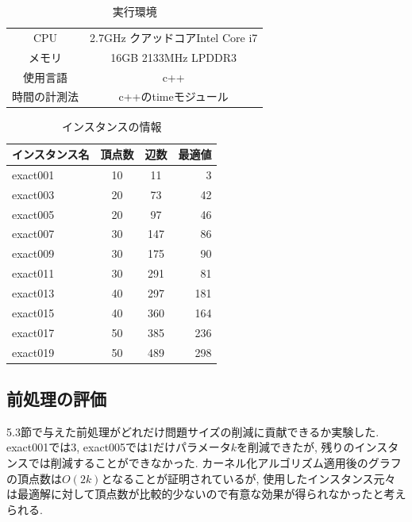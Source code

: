 \documentclass[10.5,a4paper,titlepage, dvipdfmx]{bxjsarticle}
\begin{document}
\begin{table}[H]
    \begin{center}
        \caption{実行環境}
        \begin{tabular}{c|c}
    CPU         & 2.7GHz クアッドコアIntel Core i7 \\
    メモリ & 16GB 2133MHz LPDDR3 \\
    使用言語 & c++ \\
    時間の計測法 & c++のtimeモジュール \\
        \end{tabular}{}
    \end{center}
\end{table}

\begin{table}[H]
    \caption{インスタンスの情報}
    \label{table:data_type}
    \centering
    \begin{tabular}{l|ccr}
        \hline
        インスタンス名  & 頂点数  &  辺数 & 最適値  \\
        \hline \hline
        exact001  & 10  & 11  & 3\\
        exact003  & 20   & 73 & 42\\
        exact005  & 20  & 97 & 46\\
        exact007  & 30  &  147  & 86\\
        exact009  & 30 & 175  & 90\\
        exact011  & 30 & 291  & 81\\
        exact013  & 40 & 297  & 181\\
        exact015  & 40 & 360  & 164\\
        exact017  & 50 & 385  & 236\\
        exact019  & 50 & 489  & 298\\
        \hline
    \end{tabular}
\end{table}


\subsection{前処理の評価}
5.3節で与えた前処理がどれだけ問題サイズの削減に貢献できるか実験した.
exact001では3, exact005では1だけパラメータ$k$を削減できたが, 残りのインスタンスでは削減することができなかった.
カーネル化アルゴリズム適用後のグラフの頂点数は$O(2k)$となることが証明されているが, 使用したインスタンス元々は最適解に対して頂点数が比較的少ないので有意な効果が得られなかったと考えられる.
\end{document}

